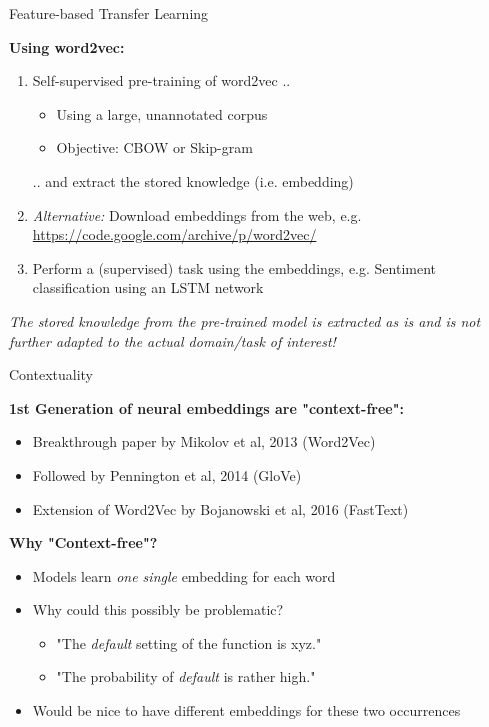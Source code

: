 \begin{vbframe}{Feature-based Transfer Learning}

\vfill

\textbf{Using word2vec:}
	
	\begin{enumerate}
		\item Self-supervised pre-training of word2vec ..
			\begin{itemize}
				\item Using a large, unannotated corpus
				\item Objective: CBOW or Skip-gram
			\end{itemize}
		.. and extract the stored knowledge (i.e. embedding)\\
		\item \textit{Alternative:} Download embeddings from the web,
		e.g. \url{https://code.google.com/archive/p/word2vec/}
		\item Perform a (supervised) task using the embeddings,
		e.g. Sentiment classification using an LSTM network
	\end{enumerate}
	
\textit{The stored knowledge from the pre-trained model is extracted as is
and is not further adapted to the actual domain/task of interest!}

\vfill

\end{vbframe}


\begin{vbframe}{Contextuality}

\vfill

\textbf{1st Generation of neural embeddings are "context-free":}

	\begin{itemize}
		\item Breakthrough paper by Mikolov et al, 2013 (Word2Vec)
		\item Followed by Pennington et al, 2014 (GloVe)
		\item Extension of Word2Vec by Bojanowski et al, 2016 (FastText)
	\end{itemize}
	
	\textbf{Why "Context-free"?}
	
	\begin{itemize}
		\item Models learn \textit{one single} embedding for each word
		\item Why could this possibly be problematic?
			\begin{itemize}
				\item "The \textit{default} setting of the function is xyz."
				\item "The probability of \textit{default} is rather high."
			\end{itemize}
		\item Would be nice to have different embeddings for these two occurrences
	\end{itemize}
	
\vfill

\end{vbframe}

